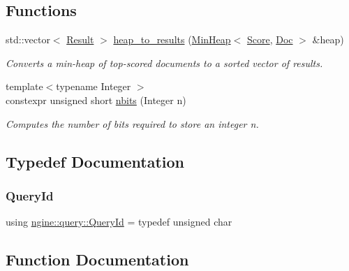 \subsection*{Functions}
\begin{DoxyCompactItemize}
\item 
std\+::vector$<$ \hyperlink{structngine_1_1query_1_1Result}{Result} $>$ \hyperlink{namespacengine_1_1query_acbd33799a7a03ed02a16710112720630}{heap\+\_\+to\+\_\+results} (\hyperlink{classngine_1_1MinHeap}{Min\+Heap}$<$ \hyperlink{structngine_1_1Score}{Score}, \hyperlink{structngine_1_1Doc}{Doc} $>$ \&heap)
\begin{DoxyCompactList}\small\item\em Converts a min-\/heap of top-\/scored documents to a sorted vector of results. \end{DoxyCompactList}\item 
{\footnotesize template$<$typename Integer $>$ }\\constexpr unsigned short \hyperlink{namespacengine_1_1query_a42ebbff17494de704d3064596a66f59a}{nbits} (Integer n)
\begin{DoxyCompactList}\small\item\em Computes the number of bits required to store an integer n. \end{DoxyCompactList}\end{DoxyCompactItemize}


\subsection{Typedef Documentation}
\mbox{\label{namespacengine_1_1query_a3deddbc36af48dca2072f880a752b001}} 
\subsubsection{\texorpdfstring{Query\+Id}{QueryId}}
{\footnotesize\ttfamily using \hyperlink{namespacengine_1_1query_a3deddbc36af48dca2072f880a752b001}{ngine\+::query\+::\+Query\+Id} = typedef unsigned char}



\subsection{Function Documentation}
\mbox{\label{namespacengine_1_1query_acbd33799a7a03ed02a16710112720630}} 
